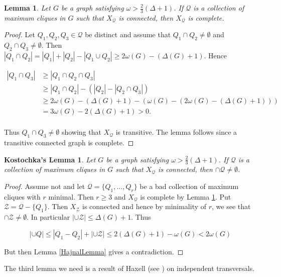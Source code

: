 \documentclass[12pt]{article}
\theoremstyle{plain}
\newtheorem*{KostochkasLemma}{Kostochka's Lemma}
\newtheorem{lem}[thm]{Lemma}
\theoremstyle{definition}
\theoremstyle{remark}
\begin{document}
\begin{lem}\label{TwoThirdsLemma}
Let $G$ be a graph satisfying $\omega > \frac{2}{3}(\Delta + 1)$.   If $\mathcal{Q}$ is a collection of maximum cliques in $G$ such that $X_{\mathcal{Q}}$ is connected, then $X_{\mathcal{Q}}$ is complete.
\end{lem}
\begin{proof}
Let $Q_1, Q_2, Q_3 \in \mathcal{Q}$ be distinct and assume that $Q_1 \cap Q_2 \neq \emptyset$ and $Q_2 \cap Q_3 \neq \emptyset$.  Then $|Q_1 \cap Q_2| = |Q_1| + |Q_2| - |Q_1 \cup Q_2| \geq 2\omega(G) - (\Delta(G) + 1)$.  Hence

\begin{align*}
|Q_1 \cap Q_3| &\geq |Q_1 \cap Q_2 \cap Q_3| \\
&\geq |Q_1 \cap Q_2| - (|Q_2| - |Q_2 \cap Q_3|) \\
&\geq 2\omega(G) - (\Delta(G) + 1) - (\omega(G) - (2\omega(G) - (\Delta(G) + 1))) \\
&= 3\omega(G) - 2(\Delta(G) + 1) > 0.\\
\end{align*}

Thus $Q_1 \cap Q_3 \neq \emptyset$ showing that $X_{\mathcal{Q}}$ is transitive.  The lemma follows since a transitive connected graph is complete.
\end{proof}

\begin{KostochkasLemma}
Let $G$ be a graph satisfying $\omega > \frac{2}{3}(\Delta + 1)$.   If $\mathcal{Q}$ is a collection of maximum cliques in $G$ such that $X_{\mathcal{Q}}$ is connected, then $\cap \mathcal{Q} \neq \emptyset$.
\end{KostochkasLemma}
\begin{proof}
Assume not and let $\mathcal{Q} = \{Q_1, ..., Q_r\}$ be a bad collection of maximum cliques with $r$ minimal.  Then $r \geq 3$ and $X_{\mathcal{Q}}$ is complete by Lemma \ref{TwoThirdsLemma}.  Put $\mathcal{Z} = \mathcal{Q} - \{Q_1\}$.  Then $X_{\mathcal{Z}}$ is connected and hence by minimality of $r$, we see that $\cap \mathcal{Z} \neq \emptyset$.  In particular $|\cup \mathcal{Z}| \leq \Delta(G) + 1$.  Thus

\[|\cup Q| \leq |Q_1 - Q_2| + |\cup \mathcal{Z}| \leq 2(\Delta(G) + 1) - \omega(G) < 2\omega(G)\]

But then Lemma \ref{HajnalLemma} gives a contradiction.
\end{proof}

The third lemma we need is a result of Haxell (see \cite{Haxell}) on independent transversals.
\end{document}
